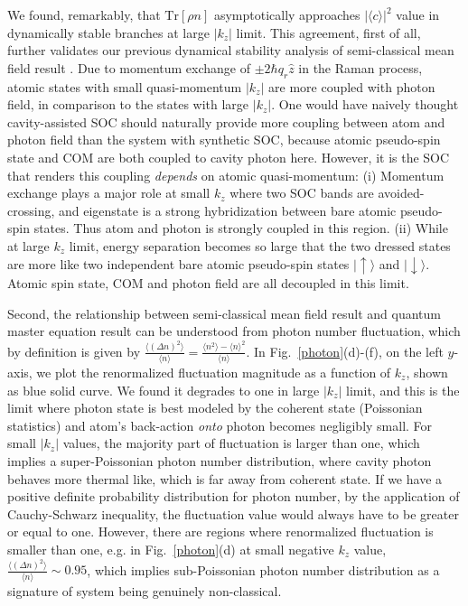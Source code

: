 \documentclass[atoms,article,submit,moreauthors,pdftex,12pt,a4paper]{mdpi}
\begin{document}
We found, remarkably, that $\text{Tr}[\rho n]$ asymptotically approaches $|\langle c\rangle|^2$ value in dynamically stable branches at large $|k_z|$ limit. 
This agreement, first of all, further validates our previous dynamical stability analysis of semi-classical mean field result \cite{cavitySOC}. Due to momentum exchange of $\pm2\hbar q_r\hat{z}$ in the Raman process, atomic states with small quasi-momentum $|k_z|$ are more coupled with photon field, in comparison to the states with large  $|k_z|$. One would have naively thought cavity-assisted SOC should naturally provide more coupling between atom and photon field than the system with synthetic SOC, because atomic pseudo-spin state and COM are both coupled to cavity photon here. However, it is the SOC that renders this coupling {\em depends} on atomic quasi-momentum: (i) Momentum exchange plays a major role at small $k_z$ where two SOC bands are avoided-crossing, and eigenstate is a strong hybridization between bare atomic pseudo-spin states. Thus atom and photon is strongly coupled in this region. (ii) While at large $k_z$ limit, energy separation becomes so large that the two dressed states are more like two independent bare atomic pseudo-spin states $|\uparrow\rangle$ and $|\downarrow\rangle$. Atomic spin state, COM and photon field are all decoupled in this limit. 
 
Second, 
the relationship between semi-classical mean field result and quantum master equation result can be understood from photon number fluctuation, which by definition is given by $\frac{\langle(\Delta n)^{2}\rangle}{\langle n\rangle}=\frac{\langle n^{2}\rangle-\langle n\rangle^{2}}{\langle n\rangle}$. In Fig.~\ref{photon}(d)-(f), on the left $y$-axis, we plot the renormalized fluctuation magnitude as a function of $k_z$, shown as blue solid curve. We found it degrades to one in large $|k_z|$ limit, and this is the limit where photon state is best modeled by the coherent state (Poissonian statistics) and atom's back-action {\em onto} photon becomes negligibly small. 
For small $|k_z|$ values, the majority part of fluctuation is larger than one, which implies a super-Poissonian photon number distribution, where cavity photon behaves more thermal like, which is far away from coherent state. If we have a  positive definite probability distribution for photon number, by the application of Cauchy-Schwarz inequality, the fluctuation value would always have to be greater or equal to one. However, there are regions where renormalized fluctuation is smaller than one, e.g. in Fig.~\ref{photon}(d) at small negative $k_z$ value,  $\frac{\langle(\Delta n)^{2}\rangle}{\langle n\rangle} \sim 0.95$, which implies sub-Poissonian photon number distribution as a signature of system being genuinely non-classical. 
\end{document}
